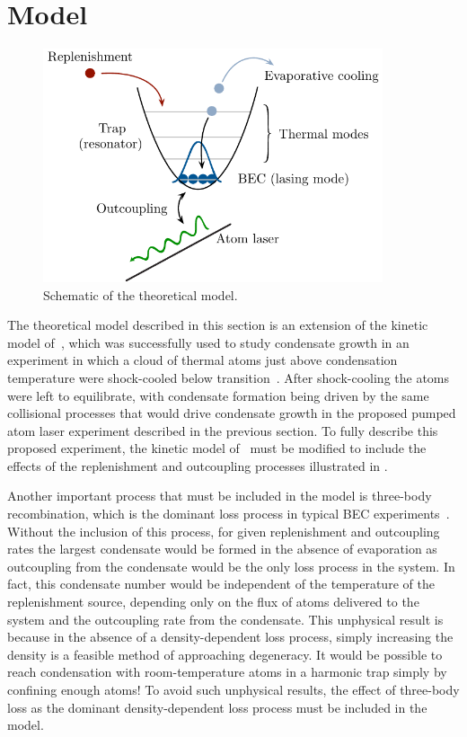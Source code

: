 \section{Model}
\label{KineticTheory:Model}

\begin{figure}
    \centering
        \includegraphics[width=10cm]{QKTModel2}
    \caption{Schematic of the theoretical model.}
    \label{KineticTheory:QKTModel}
\end{figure}

The theoretical model described in this section is an extension of the kinetic model of~\citet{Bijlsma:2000}, which was successfully used to study condensate growth in an experiment in which a cloud of thermal atoms just above condensation temperature were shock-cooled below transition~\citep{Miesner:1998}.  After shock-cooling the atoms were left to equilibrate, with condensate formation being driven by the same collisional processes that would drive condensate growth in the proposed pumped atom laser experiment described in the previous section.  To fully describe this proposed experiment, the kinetic model of~\citeauthor{Bijlsma:2000} must be modified to include the effects of the replenishment and outcoupling processes illustrated in . 

Another important process that must be included in the model is three-body recombination, which is the dominant loss process in typical BEC experiments~\citep{Burt:1997fk,Soding:1999}. Without the inclusion of this process, for given replenishment and outcoupling rates the largest condensate would be formed in the absence of evaporation as outcoupling from the condensate would be the only loss process in the system. In fact, this condensate number would be independent of the temperature of the replenishment source, depending only on the flux of atoms delivered to the system and the outcoupling rate from the condensate. This unphysical result is because in the absence of a density-dependent loss process, simply increasing the density is a feasible method of approaching degeneracy. It would be possible to reach condensation with room-temperature atoms in a harmonic trap simply by confining enough atoms! To avoid such unphysical results, the effect of three-body loss as the dominant density-dependent loss process must be included in the model.

